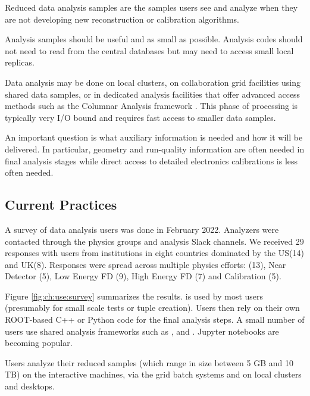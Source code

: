 \documentclass[../main-v1.tex]{subfiles}
\begin{document}
Reduced data analysis samples  are the samples users see and analyze when they are not developing new reconstruction  or calibration algorithms. 

Analysis samples should be useful and as small as possible.  Analysis codes should not need to read from the central databases but may need to access small local replicas. 

Data analysis may be done on local clusters, on collaboration grid facilities using shared data samples, or in dedicated analysis facilities that offer advanced access methods such as the Columnar Analysis framework .  %
This phase of processing is typically very I/O bound and requires fast access to smaller data samples. 


An important question is what auxiliary information is needed and how it will be delivered. In particular, geometry and run-quality information are often needed in final analysis stages while direct access to detailed electronics calibrations is less often needed. 

\subsection{Current Practices}

A survey of data analysis users was done in February 2022.  Analyzers were contacted through the physics groups and analysis Slack channels.  We received 29 responses with users from institutions in eight countries dominated by the US(14) and UK(8). 
Responses were spread across multiple physics efforts: 	(13),
Near Detector	(5),
Low Energy FD	(9),
High Energy FD	(7) and 
Calibration	(5).  



Figure \ref{fig:ch:use:survey} summarizes the results.   is used by most users (presumably for small scale tests or tuple creation).  Users then rely on their own ROOT-based C++ or Python code for the final analysis steps.  A small number of users use shared analysis frameworks such as ,  and .  Jupyter notebooks are becoming popular. %

Users analyze their reduced samples (which range in size between 5 GB and 10 TB) on the  interactive machines, via the grid batch systems and on local clusters and desktops. 
\end{document}
